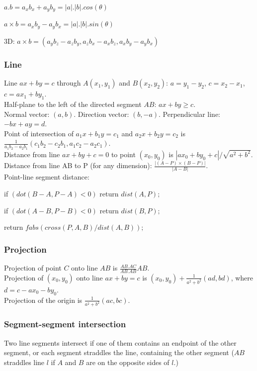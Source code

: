 \documentclass[a4paper,12pt]{article}
\begin{document}
\bigskip

$a . b = a_{x}b_{x} + a_{y}b_{y} = |a| . |b| . cos(\theta)$

$a \times b = a_{x}b_{y} - a_{y}b_{x} = |a| . |b| . sin(\theta)$

3D: $a \times b = (a_{y}b_{z} - a_{z}b_{y}, a_{z}b_{x} - a_{x}b_{z}, a_{x}b_{y} - a_{y}b_{x})$

\subsubsection{Line}
Line $ax + by = c$ through $A(x_{1}, y_{1})$ and $B(x_{2}, y_{2})$: $a = y_{1} - y_{2}$, $c = x_{2} - x_{1}$, $c = ax_{1} + by_{1}$.\\
Half-plane to the left of the directed segment $AB$: $ax + by \geq c$.\\
Normal vector: $(a, b)$. Direction vector: $(b, -a)$. Perpendicular line: $-bx + ay = d$.\\
Point of intersection of $a_{1}x + b_{1}y = c_{1}$ and $a_{2}x + b_{2}y = c_{2}$ is $\frac{1}{a_{1}b_{2} - a_{2}b_{1}}(c_{1}b_{2} - c_{2}b_{1}, a_{1}c_{2} - a_{2}c_{1})$.\\
Distance from line $ax + by + c = 0$ to point $(x_{0}, y_{0})$ is $|ax_{0} + by_{0} + c|/\sqrt{a^2 + b^2}$.\\
Distance from line AB to P (for any dimension): $\frac{|(A - P) \times (B - P)|}{|A - B|}$.\\
Point-line segment distance:

if $(dot(B - A, P - A) < 0)$ return $dist(A, P);$

if $(dot(A - B, P - B) < 0)$ return $dist(B, P);$

return $fabs(cross(P, A, B)/dist(A, B));$

\subsubsection{Projection}
Projection of point $C$ onto line $AB$ is $\frac{AB.AC}{AB.AB}AB$.\\
Projection of $(x_{0}, y_{0})$ onto line $ax + by = c$ is $(x_{0}, y_{0}) + \frac{1}{a^2 + b^2}(ad, bd)$, where $d = c - ax_{0} - by_{0}$.\\
Projection of the origin is $\frac{1}{a^2 + b^2}(ac, bc)$.

\subsubsection{Segment-segment intersection}
Two line segments intersect if one of them contains an endpoint of the other segment, or each segment straddles the line, containing the other segment ($AB$ straddles line $l$ if $A$ and $B$ are on the opposite sides of $l$.)
\end{document}
